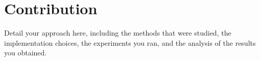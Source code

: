 \chapter{Contribution}

Detail your approach here, including the methods that were studied, the
implementation choices, the experiments you ran, and the analysis of the
results you obtained.
